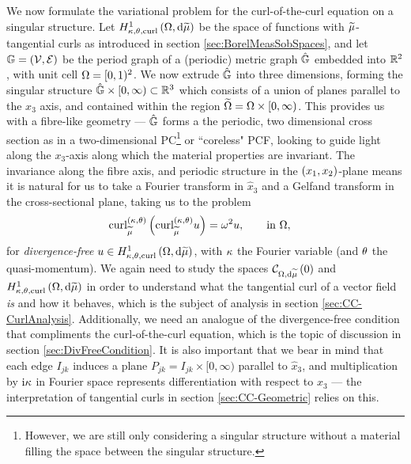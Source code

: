 We now formulate the variational problem for the curl-of-the-curl equation on a singular structure.
Let $H^1_{\kappa,\theta,\mathrm{curl}}\left( \Omega, \mathrm{d}\widetilde{\mu} \right)$ be the space of functions with $\widetilde{\mu}$-tangential curls as introduced in section \ref{sec:BorelMeasSobSpaces}, and let $\mathbb{G}=\left( \mathcal{V},\mathcal{E} \right)$ be the period graph of a (periodic) metric graph $\hat{\mathbb{G}}$ embedded into $\mathbb{R}^2$, with unit cell $\Omega=[0,1)^2$.
We now extrude $\hat{\mathbb{G}}$ into three dimensions, forming the singular structure $\hat{\mathbb{G}}\times[0,\infty)\subset\mathbb{R}^3$ which consists of a union of planes parallel to the $x_3$ axis, and contained within the region $\widetilde{\Omega}=\Omega\times[0,\infty)$.
This provides us with a fibre-like geometry --- $\hat{\mathbb{G}}$ forms a the periodic, two dimensional cross section as in a two-dimensional PC\footnote{However, we are still only considering a singular structure without a material filling the space between the singular structure.} or ``coreless" PCF, looking to guide light along the $x_3$-axis along which the material properties are invariant.
The invariance along the fibre axis, and periodic structure in the $\left( x_1,x_2 \right)$-plane means it is natural for us to take a Fourier transform in $\widehat{x}_3$ and a Gelfand transform in the cross-sectional plane, taking us to the problem
\begin{align} \label{eq:SingularCurlEquation}
	\mathrm{curl}_{\widetilde{\mu}}^{\left( \kappa, \theta \right)}\left(  \mathrm{curl}_{\widetilde{\mu}}^{\left( \kappa, \theta \right)}u  \right) &= \omega^2 u,
	\qquad \text{in } \Omega,
\end{align}
for \emph{divergence-free} $u\in H^1_{\kappa,\theta,\mathrm{curl}}\left( \Omega, \mathrm{d}\widetilde{\mu} \right)$, with $\kappa$ the Fourier variable (and $\theta$ the quasi-momentum).
We again need to study the spaces $\mathcal{C}_{ \Omega, \mathrm{d}\widetilde{\mu}}\left( 0 \right)$ and $H^1_{\kappa,\theta,\mathrm{curl}}\left( \Omega, \mathrm{d}\widetilde{\mu} \right)$ in order to understand what the tangential curl of a vector field \emph{is} and how it behaves, which is the subject of analysis in section \ref{sec:CC-CurlAnalysis}.
Additionally, we need an analogue of the divergence-free condition that compliments the curl-of-the-curl equation, which is the topic of discussion in section \ref{sec:DivFreeCondition}.
It is also important that we bear in mind that each edge $I_{jk}$ induces a plane $P_{jk} = I_{jk}\times[0,\infty)$ parallel to $\widehat{x}_3$, and multiplication by $\mathrm{i}\kappa$ in Fourier space represents differentiation with respect to $x_3$ --- the interpretation of tangential curls in section \ref{sec:CC-Geometric} relies on this.

